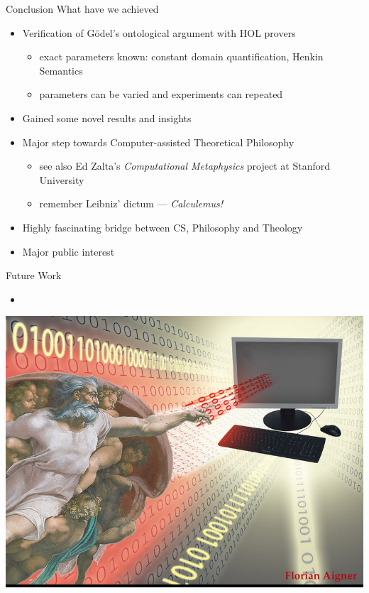 \begin{frame}{Conclusion} \large
What have we achieved \\[.5em]
\begin{itemize}
\item Verification of G\"odel's ontological argument with HOL provers
  \begin{itemize}
  \item exact parameters known: constant domain quantification, Henkin Semantics
  \item parameters can be varied and experiments can repeated
  \end{itemize}
\item Gained some novel results and insights
\item Major  step towards \alert{Computer-assisted Theoretical Philosophy}
 \begin{itemize}
  \item see also Ed Zalta's \emph{Computational Metaphysics} project at Stanford University
  \item remember Leibniz' dictum --- \emph{Calculemus!}
  \end{itemize}
\item Highly fascinating bridge between CS, Philosophy and Theology
\item Major public interest 
\end{itemize}
\vfill
Future Work
\begin{itemize}
\item 
\end{itemize}
\end{frame}

\begin{frame}[plain]
\colorbox{black}{\includegraphics[width=\textwidth]{TUWien-GodComputerC}}
\end{frame}
